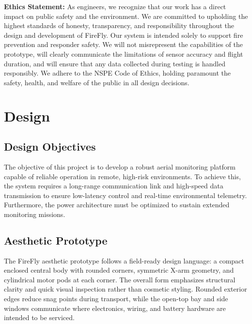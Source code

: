 \documentclass[journal, onecolumn]{IEEEtran}
\begin{document}
\vspace{1em}

\textbf{Ethics Statement:}
As engineers, we recognize that our work has a direct impact on public safety and the environment. We are committed to upholding the highest standards of honesty, transparency, and responsibility throughout the design and development of FireFly. Our system is intended solely to support fire prevention and responder safety. We will not misrepresent the capabilities of the prototype, will clearly communicate the limitations of sensor accuracy and flight duration, and will ensure that any data collected during testing is handled responsibly. We adhere to the NSPE Code of Ethics, holding paramount the safety, health, and welfare of the public in all design decisions.



\section{Design}

\subsection{Design Objectives}
The objective of this project is to develop a robust aerial monitoring platform capable of reliable operation in remote, high-risk environments. To achieve this, the system requires a long-range communication link and high-speed data transmission to ensure low-latency control and real-time environmental telemetry. Furthermore, the power architecture must be optimized to sustain extended monitoring missions.

\newpage

\subsection{Aesthetic Prototype}

The FireFly aesthetic prototype follows a field-ready design language: a compact enclosed central body with rounded corners, symmetric X-arm geometry, and cylindrical motor pods at each corner. The overall form emphasizes structural clarity and quick visual inspection rather than cosmetic styling. Rounded exterior edges reduce snag points during transport, while the open-top bay and side windows communicate where electronics, wiring, and battery hardware are intended to be serviced.
\end{document}
